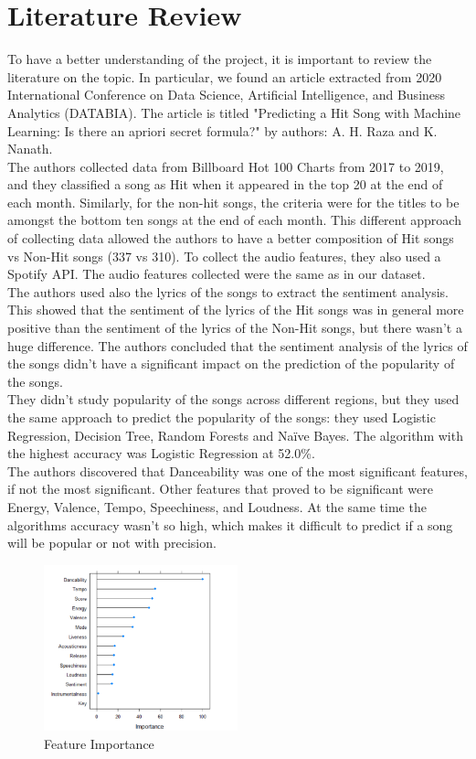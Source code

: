 \chapter{Literature Review}

To have a better understanding of the project, it is important to review the literature on the topic. In particular, we found an article extracted from 2020 International Conference on Data Science, Artificial Intelligence, and Business Analytics (DATABIA). The article is titled "Predicting a Hit Song with Machine Learning: Is there an apriori secret formula?" by authors: A. H. Raza and K. Nanath. \\
The authors collected data from Billboard Hot 100 Charts from 2017 to 2019, and they classified a song as Hit when it appeared in the top 20 at the end of each month. Similarly, for the non-hit songs, the criteria were for the titles to be amongst the bottom ten songs at the end of each month.
This different approach of collecting data allowed the authors to have a better composition of Hit songs vs Non-Hit songs (337 vs 310). To collect the audio features, they also used a Spotify API. The audio features collected were the same as in our dataset. \\
The authors used also the lyrics of the songs to extract the sentiment analysis. This showed that the sentiment of the lyrics of the Hit songs was in general more positive than the sentiment of the lyrics of the Non-Hit songs, but there wasn't a huge difference. The authors concluded that the sentiment analysis of the lyrics of the songs didn't have a significant impact on the prediction of the popularity of the songs. \\
They didn't study popularity of the songs across different regions, but they used the same approach to predict the popularity of the songs: they used Logistic Regression, Decision Tree, Random Forests and Naïve Bayes.
The algorithm with the highest accuracy was Logistic Regression at 52.0\%. \\
The authors discovered that Danceability was one of the most significant features, if not the most significant. Other features that proved to be significant were Energy, Valence, Tempo, Speechiness, and Loudness. At the same time the algorithms accuracy wasn't so high, which makes it difficult to predict if a song will be popular or not with precision. \\

\begin{figure} [H]
    \centering
    \includegraphics[width=0.5\textwidth]{media/state_of_art_feat_imp.png}
    \caption{Feature Importance}
    \label{fig:feature_importance}
\end{figure}